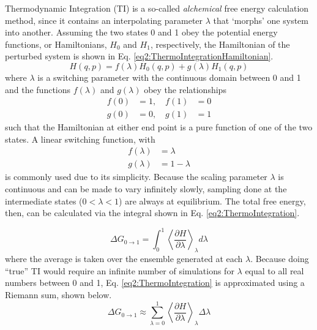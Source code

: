 Thermodynamic Integration (TI) is a so-called \emph{alchemical} free energy
calculation method, since it contains an interpolating parameter $\lambda$ that
`morphs' one system into another. \cite{Leach_Book_MolModel_2001,
Tuckerman_Book_StatMech_TheoryAndSim} Assuming the two states 0 and 1 obey the
potential energy functions, or Hamiltonians, $H_0$ and $H_1$, respectively, the
Hamiltonian of the perturbed system is shown in Eq.
\ref{eq2:ThermoIntegrationHamiltonian}.
\begin{equation}
   H(q,p) = f(\lambda) H_0(q,p) + g(\lambda) H_1(q,p)
   \label{eq2:ThermoIntegrationHamiltonian}
\end{equation}
where $\lambda$ is a switching parameter with the continuous domain between 0
and 1 and the functions $f(\lambda)$ and $g(\lambda)$ obey the relationships
\begin{eqnarray*}
   f(0) & = 1,\quad f(1) & = 0 \\
   g(0) & = 0,\quad g(1) & = 1
\end{eqnarray*}
such that the Hamiltonian at either end point is a pure function of one of the
two states. A linear switching function, with
\begin{eqnarray*}
   f(\lambda) & = \lambda \\
   g(\lambda) & = 1 - \lambda
\end{eqnarray*}
is commonly used due to its simplicity. Because the scaling parameter
$\lambda$ is continuous and can be made to vary infinitely slowly, sampling done
at the intermediate states (\ie $0 < \lambda < 1$) are always at equilibrium.
The total free energy, then, can be calculated via the integral shown in Eq.
\ref{eq2:ThermoIntegration}. \cite{Leach_Book_MolModel_2001}

\begin{equation}
   \Delta G_{0 \rightarrow 1} = \int _ 0 ^ 1 \left \langle \frac {\partial H}
         {\partial \lambda} \right \rangle _ {\lambda} d\lambda
   \label{eq2:ThermoIntegration}
\end{equation}
where the average is taken over the ensemble generated at each $\lambda$.
Because doing ``true'' TI would require an infinite number of simulations for
$\lambda$ equal to all real numbers between 0 and 1, Eq.
\ref{eq2:ThermoIntegration} is approximated using a Riemann sum, shown below.
\begin{equation*}
   \Delta G_{0 \rightarrow 1} \approx \sum _ {\lambda = 0} ^ 1 \left \langle
         \frac {\partial H} {\partial \lambda} \right \rangle _ {\lambda} \Delta
         \lambda
\end{equation*}

